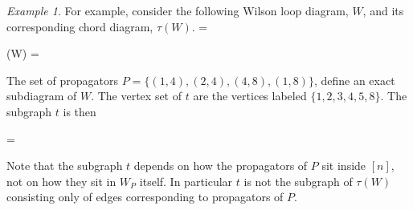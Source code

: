 \documentclass[11pt]{article}
\newcommand{\drawWLD}[2]{

\pgfmathsetmacro{\n}{#1}
\pgfmathsetmacro{\radius}{#2}
\pgfmathsetmacro{\angle}{360/\n}
\draw (0,0) circle (\radius);
    \foreach \i in {1,2,...,\n} {
      \draw (\angle*\i:\radius) node {$\bullet$};
    }

}
\newcommand{\drawpolypart}[2]{
\pgfmathsetmacro{\n}{#1}
\pgfmathsetmacro{\radius}{#2}
\pgfmathsetmacro{\angle}{360/\n}
    \foreach \i in {1,2,...,\n} {
      \draw (\angle*\i+ \angle/2:\radius) node {$\bullet$};
     \pgfmathsetmacro{\x}{\angle*\i - \angle/2}
      \pgfmathsetmacro{\concave}{((\n-1.5)/\n)}
      \draw (\x:\radius cm) .. controls (\angle *\i: \concave* \radius cm) .. (\x + \angle:\radius cm);
    }

}
\newcommand{\drawprop}[4]{
\pgfmathsetmacro{\r}{#1}
\pgfmathsetmacro{\bumpr}{#2}
\pgfmathsetmacro{\s}{#3}
\pgfmathsetmacro{\bumps}{#4}
\pgfmathsetmacro{\perturbe}{\angle/\n}

\begin{scope}
\draw[propagator] (\angle*\r + \angle/2 + \bumpr*\perturbe:\radius) -- (\angle*\s + \angle/2 + \bumps*\perturbe:\radius);
\end{scope}
}
\newcommand{\drawchord}[2]{
\pgfmathsetmacro{\r}{#1}
\pgfmathsetmacro{\s}{#2}

\begin{scope}
\draw (\angle*\r + \angle/2:\radius) -- (\angle*\s + \angle/2:\radius);
\end{scope}
}
\newcommand{\drawnumbers}{
  \foreach \i in {1,2,...,\n} {
  \pgfmathsetmacro{\x}{\angle*\i}
  \draw (\x:\radius*1.15) node {\footnotesize \i};
}
}
\newcommand{\drawnumbersshift}{
  \foreach \i in {1,2,...,\n} {
  \pgfmathsetmacro{\x}{\angle*\i + \angle/2}
  \draw (\x:\radius*1.15) node {\footnotesize \i};
}
}
\def\bas #1\eas{\begin{align*} #1 \end{align*}}
\theoremstyle{remark}
\newtheorem{eg}[thm]{Example}
\theoremstyle{definition}
\begin{document}
\begin{eg}
For example, consider the following Wilson loop diagram, $W$, and its corresponding chord diagram, $\tau(W)$. 
\bas W =   \; \quad
\tau(W) =  \eas

The set of propagators $P= \{(1,4), (2,4), (4, 8), (1,8) \}$, define an exact subdiagram of $W$. The vertex set of $t$ are the vertices labeled $\{1, 2,3, 4, 5, 8\}$. The subgraph $t$ is then 

\bas t = 
 \eas

Note that the subgraph $t$ depends on how the propagators of $P$ sit inside $[n]$, not on how they sit in $W_P$ itself.  In particular $t$ is not the subgraph of $\tau(W)$ consisting only of edges corresponding to propagators of $P$. 
\end{eg}
\end{document}
